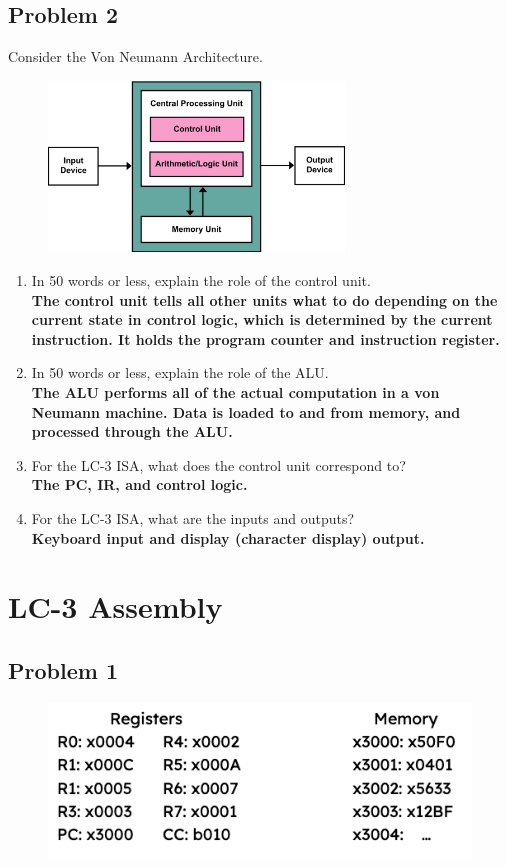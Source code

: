 \documentclass{article}
\begin{document}
\subsection*{Problem 2}
Consider the Von Neumann Architecture.
\begin{figure}[!h]
    \centering
    \includegraphics[width=0.7\textwidth]{figures/von_neumann.png}
\end{figure}
\begin{enumerate}[label=\alph*]
\item In 50 words or less, explain the role of the control unit. \\
\textbf{The control unit tells all other units what to do depending on the current state in control logic, which is determined by the current instruction. It holds the program counter and instruction register. }
\item In 50 words or less, explain the role of the ALU. \\
\textbf{The ALU performs all of the actual computation in a von Neumann machine. Data is loaded to and from memory, and processed through the ALU.}
\item For the LC-3 ISA, what does the control unit correspond to? \\
\textbf{The PC, IR, and control logic.}
\item For the LC-3 ISA, what are the inputs and outputs? \\
\textbf{Keyboard input and display (character display) output.}
\end{enumerate}

\newpage
\section*{LC-3 Assembly}
\subsection*{Problem 1}
\begin{figure}[!h]
    \centering
    \includegraphics[width=1\textwidth]{figures/lc3_q1.png}
\end{figure}
\end{document}

